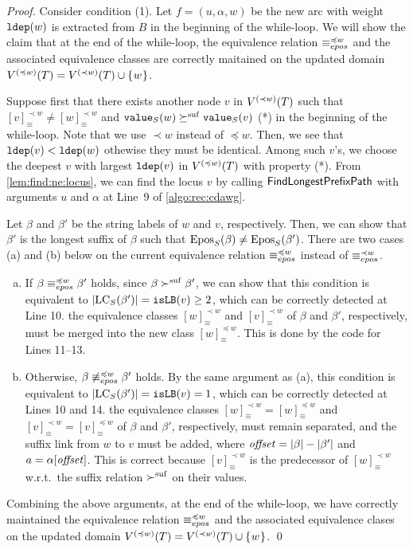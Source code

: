 \begin{proof}
Consider condition (1). Let $f = (u, \alpha, w)$ be the new arc with weight $\ldep(w)$ is extracted from $B$ in the beginning of the while-loop.
We will show the claim that at the end of the while-loop, the equivalence relation $\eqepos[\preceq w]$ and the associated equivalence classes are correctly maitained on the updated domain $V\rk{\preceq w}(T) = V\rk{\prec w}(T) \cup \set{w}$. 

Suppose first that there exists another node $v$ in $V\rk{\prec w}(T)$ such that $[v]^{\prec w}_{\equiv} \not= [w]^{\prec w}_{\equiv}$ and $\Value(w) \succeqsuf \Value(v)$ (*) in the beginning of the while-loop. Note that we use $\prec w$ instead of $\preceq w$. Then, we see that $\ldep(v) < \ldep(w)$ othewise they must be identical. 
Among such $v$'s, we choose the deepest $v$ with largest $\ldep(v)$ in $V\rk{\preceq w}(T)$ with property (*).
From \cref{lem:find:ne:locus}, we can find the locus $v$ by calling $\FindNonEquivLocus$ with arguments $u$ and $\alpha$ at Line~9 of \cref{algo:rec:cdawg}. 


Let $\beta$ and $\beta'$ be the string labels of $w$ and $v$, respectively. Then, we can show that $\beta'$ is the longest suffix of $\beta$ such that $\Epos(\beta) \not= \Epos(\beta')$.
There are two cases (a) and (b) below on the current equivalence relation $\eqepos[\preceq w]$ instead of $\eqepos[\prec w]$. 
\begin{enumerate}[(a)]
\item If $\beta \eqepos[\preceq w] \beta'$ holds, since $\beta \succsuf \beta'$, we can show that this condition is equivalent to $|\LC(\beta')| = \op{isLB}(v) \ge 2$, which can be correctly detected at Line 10. 
  the equivalence classes $[w]^{\prec w}_{\equiv}$ and $[v]^{\prec w}_{\equiv}$ of $\beta$ and $\beta'$, respectively, must be merged into the new class $[w]^{\preceq w}_{\equiv}$. This is done by the code for Lines 11--13. 
  
\item Otherwise, $\beta \not\eqepos[\preceq w] \beta'$ holds. By the same argument as (a), this condition is equivalent to $|\LC(\beta')| = \op{isLB}(v) = 1$, which can be correctly detected at Lines 10 and 14.
  the equivalence classes $[w]^{\prec w}_{\equiv} = [w]^{\preceq w}_{\equiv}$ and $[v]^{\prec w}_{\equiv} = [v]^{\preceq w}_{\equiv}$  of $\beta$ and $\beta'$, respectively, must remain separated, and the suffix link from $w$ to $v$ must be added, where $\id{offset} = |\beta| - |\beta'|$ and $a = \alpha[\id{offset}]$. 
  This is correct because $[v]^{\prec w}_{\equiv}$ is the predecessor of $[w]^{\prec w}_{\equiv}$ w.r.t.~the suffix relation $\succsuf$ on their values.
\end{enumerate}

Combining the above arguments, at the end of the while-loop, we have correctly maintained the equivalence relation $\eqepos[\preceq w]$ and the associated equivalence clases on the updated domain $V\rk{\preceq w}(T) = V\rk{\prec w}(T) \cup \set{w}$.
\qed\end{proof}

